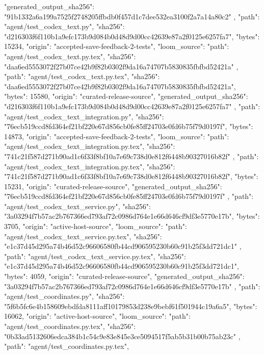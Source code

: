 {{      "generated_output_sha256": "91b1332a6a199a7525f2748205ffbdb0f457d1c7dee532ea3100f2a7a14a80c2"
    },
    {
      "path": "agent/test_codex_text.py",
      "sha256": "d216303f6f110b1a9efc173b9d084b0d48d9d00cc42639e87a2f0125e6257fa7",
      "bytes": 15234,
      "origin": "accepted-save-feedback-2-tests",
      "loom_source": {
        "path": "agent/test_codex_text.py.tex",
        "sha256": "daa6ed5553072f27b07ce42b9f82b0302f9da16a74707b5830835fbfbd52421a"
      }
    },
    {
      "path": "agent/test_codex_text.py.tex",
      "sha256": "daa6ed5553072f27b07ce42b9f82b0302f9da16a74707b5830835fbfbd52421a",
      "bytes": 15580,
      "origin": "curated-release-source",
      "generated_output_sha256": "d216303f6f110b1a9efc173b9d084b0d48d9d00cc42639e87a2f0125e6257fa7"
    },
    {
      "path": "agent/test_codex_text_integration.py",
      "sha256": "76ecb519ccd8fd364ef21bf220e67d856cb0fe85ff24703e0fd6b75f79d0197f",
      "bytes": 14873,
      "origin": "accepted-save-feedback-2-tests",
      "loom_source": {
        "path": "agent/test_codex_text_integration.py.tex",
        "sha256": "741c21f587d271b90ad1c6f33f8bf10a7e69c738d0e812f6448b90327016b82f"
      }
    },
    {
      "path": "agent/test_codex_text_integration.py.tex",
      "sha256": "741c21f587d271b90ad1c6f33f8bf10a7e69c738d0e812f6448b90327016b82f",
      "bytes": 15231,
      "origin": "curated-release-source",
      "generated_output_sha256": "76ecb519ccd8fd364ef21bf220e67d856cb0fe85ff24703e0fd6b75f79d0197f"
    },
    {
      "path": "agent/test_codex_text_service.py",
      "sha256": "3a03294f7b57ac2b767366ed793af72c0986d764e1e66d646cf9df3e5770e17b",
      "bytes": 3705,
      "origin": "active-host-source",
      "loom_source": {
        "path": "agent/test_codex_text_service.py.tex",
        "sha256": "e1c37d45d295a74b46d52c96606580fb44cd906595230b60c91b25f3dd721dc1"
      }
    },
    {
      "path": "agent/test_codex_text_service.py.tex",
      "sha256": "e1c37d45d295a74b46d52c96606580fb44cd906595230b60c91b25f3dd721dc1",
      "bytes": 4059,
      "origin": "curated-release-source",
      "generated_output_sha256": "3a03294f7b57ac2b767366ed793af72c0986d764e1e66d646cf9df3e5770e17b"
    },
    {
      "path": "agent/test_coordinates.py",
      "sha256": "5f6b5fc6e4b158609ebdfda8111aff10179853d238e9bebf61f501944c19a6a5",
      "bytes": 16062,
      "origin": "active-host-source",
      "loom_source": {
        "path": "agent/test_coordinates.py.tex",
        "sha256": "0b33ad5132606edca384b1c54c9e83e845e3ce5094517f5ab5b31b00b75ab23c"
      }
    },
    {
      "path": "agent/test_coordinates.py.tex",
}}
